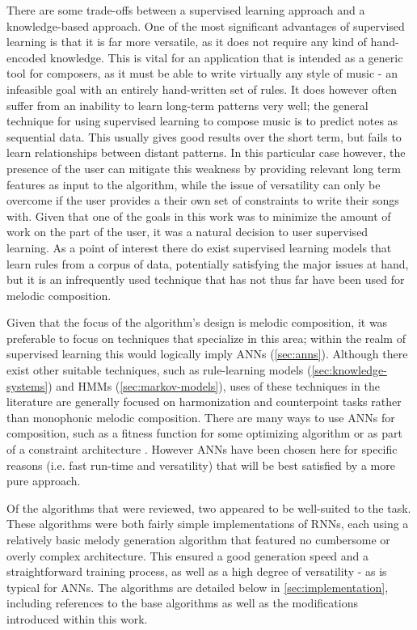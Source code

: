 \documentclass[ author={Stephen Livermore-Tozer},
				supervisor={Dr. Peter Flach},
				degree={MEng},
				title={Algorithmic Co-composition Using Machine Learning},
				subtitle={},
				type={research},
				year={2016} ]{dissertation}
\begin{document}
	There are some trade-offs between a supervised learning approach and a knowledge-based approach. One of the most significant advantages of supervised learning is that it is far more versatile, as it does not require any kind of hand-encoded knowledge. This is vital for an application that is intended as a generic tool for composers, as it must be able to write virtually any style of music - an infeasible goal with an entirely hand-written set of rules. It does however often suffer from an inability to learn long-term patterns very well; the general technique for using supervised learning to compose music is to predict notes as sequential data. This usually gives good results over the short term, but fails to learn relationships between distant patterns. In this particular case however, the presence of the user can mitigate this weakness by providing relevant long term features as input to the algorithm, while the issue of versatility can only be overcome if the user provides a their own set of constraints to write their songs with. Given that one of the goals in this work was to minimize the amount of work on the part of the user, it was a natural decision to user supervised learning. As a point of interest there do exist supervised learning models that learn rules from a corpus of data, potentially satisfying the major issues at hand, but it is an infrequently used technique that has not thus far have been used for melodic composition. 
	
	Given that the focus of the algorithm's design is melodic composition, it was preferable to focus on techniques that specialize in this area; within the realm of supervised learning this would logically imply ANNs (\ref{sec:anns}). Although there exist other suitable techniques, such as rule-learning models (\ref{sec:knowledge-systems}) and HMMs (\ref{sec:markov-models}), uses of these techniques in the literature are generally focused on harmonization and counterpoint tasks rather than monophonic melodic composition. There are many ways to use ANNs for composition, such as a fitness function for some optimizing algorithm \cite{manaris2007corpus} or as part of a constraint architecture \cite{hild1992harmonet}. However ANNs have been chosen here for specific reasons (i.e. fast run-time and versatility) that will be best satisfied by a more pure approach. %
	
	Of the algorithms that were reviewed, two appeared to be well-suited to the task. These algorithms were both fairly simple implementations of RNNs, each using a relatively basic melody generation algorithm that featured no cumbersome or overly complex architecture. This ensured a good generation speed and a straightforward training process, as well as a high degree of versatility - as is typical for ANNs. The algorithms are detailed below in \ref{sec:implementation}, including references to the base algorithms as well as the modifications introduced within this work.
	
\end{document}
